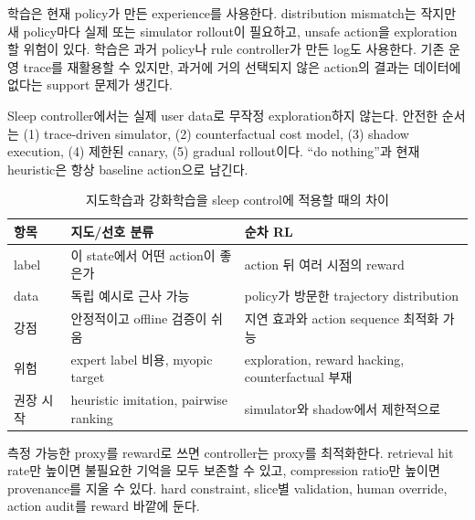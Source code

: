  학습은 현재 policy가 만든 experience를 사용한다. distribution mismatch는
작지만 새 policy마다 실제 또는 simulator rollout이 필요하고, unsafe action을 exploration할 위험이 있다.
 학습은 과거 policy나 rule controller가 만든 log도 사용한다. 기존 운영
trace를 재활용할 수 있지만, 과거에 거의 선택되지 않은 action의 결과는 데이터에 없다는 support 문제가
생긴다.

Sleep controller에서는 실제 user data로 무작정 exploration하지 않는다. 안전한 순서는 (1) trace-driven
simulator, (2) counterfactual cost model, (3) shadow execution, (4) 제한된 canary, (5) gradual rollout이다.
``do nothing''과 현재 heuristic은 항상 baseline action으로 남긴다.

\begin{table}[htbp]
\centering
\caption{지도학습과 강화학습을 sleep control에 적용할 때의 차이}
\label{tab:bg-supervised-vs-rl}
\small
\begin{tabularx}{\textwidth}{p{} X X}
\toprule
항목 & 지도/선호 분류 & 순차 RL \\
\midrule
label & 이 state에서 어떤 action이 좋은가 & action 뒤 여러 시점의 reward \\
data & 독립 예시로 근사 가능 & policy가 방문한 trajectory distribution \\
강점 & 안정적이고 offline 검증이 쉬움 & 지연 효과와 action sequence 최적화 가능 \\
위험 & expert label 비용, myopic target & exploration, reward hacking, counterfactual 부재 \\
권장 시작 & heuristic imitation, pairwise ranking & simulator와 shadow에서 제한적으로 \\
\bottomrule
\end{tabularx}
\end{table}

\begin{cautionbox}
측정 가능한 proxy를 reward로 쓰면 controller는 proxy를 최적화한다. retrieval hit rate만 높이면 불필요한
기억을 모두 보존할 수 있고, compression ratio만 높이면 provenance를 지울 수 있다. hard constraint,
slice별 validation, human override, action audit를 reward 바깥에 둔다.
\end{cautionbox}

